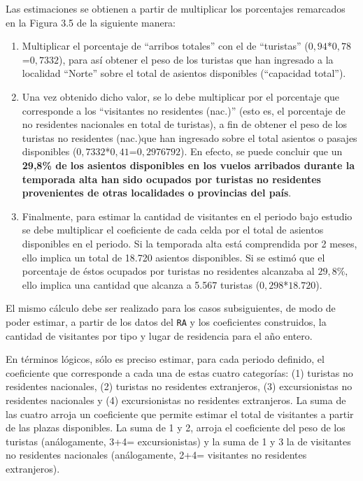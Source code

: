 \documentclass[
]{book}
\begin{document}
Las estimaciones se obtienen a partir de multiplicar los porcentajes remarcados en la Figura 3.5 de la siguiente manera:\\

\begin{enumerate}
\def\labelenumi{\arabic{enumi}.}
\item
  Multiplicar el porcentaje de ``arribos totales'' con el de ``turistas'' (\(0,94\)*\(0,78\)=\(0,7332\)), para así obtener el peso de los turistas que han ingresado a la localidad ``Norte'' sobre el total de asientos disponibles (``capacidad total'').
\item
  Una vez obtenido dicho valor, se lo debe multiplicar por el porcentaje que corresponde a los ``visitantes no residentes (nac.)'' (esto es, el porcentaje de no residentes nacionales en total de turistas), a fin de obtener el peso de los turistas no residentes (nac.)que han ingresado sobre el total asientos o pasajes disponibles (\(0,7332\)*\(0,41\)=\(0,2976792\)). En efecto, se puede concluir que un \textbf{29,8\% de los asientos disponibles en los vuelos arribados durante la temporada alta han sido ocupados por turistas no residentes provenientes de otras localidades o provincias del país}.
\item
  Finalmente, para estimar la cantidad de visitantes en el periodo bajo estudio se debe multiplicar el coeficiente de cada celda por el total de asientos disponibles en el periodo. Si la temporada alta está comprendida por 2 meses, ello implica un total de 18.720 asientos disponibles. Si se estimó que el porcentaje de éstos ocupados por turistas no residentes alcanzaba al \(29,8\%\), ello implica una cantidad que alcanza a 5.567 turistas (\(0,298\)*\(18.720\)).
\end{enumerate}

El mismo cálculo debe ser realizado para los casos subsiguientes, de modo de poder estimar, a partir de los datos del \texttt{RA} y los coeficientes construidos, la cantidad de visitantes por tipo y lugar de residencia para el año entero.

En términos lógicos, sólo es preciso estimar, para cada periodo definido, el coeficiente que corresponde a cada una de estas cuatro categorías: (1) turistas no residentes nacionales, (2) turistas no residentes extranjeros, (3) excursionistas no residentes nacionales y (4) excursionistas no residentes extranjeros. La suma de las cuatro arroja un coeficiente que permite estimar el total de visitantes a partir de las plazas disponibles. La suma de 1 y 2, arroja el coeficiente del peso de los turistas (análogamente, 3+4= excursionistas) y la suma de 1 y 3 la de visitantes no residentes nacionales (análogamente, 2+4= visitantes no residentes extranjeros).
\end{document}
